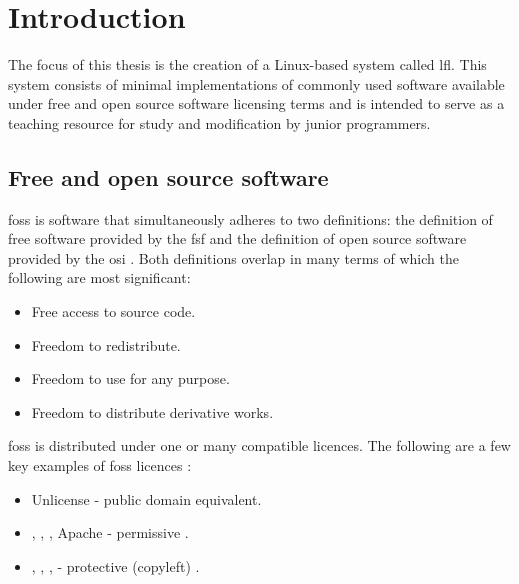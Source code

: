 \section{Introduction}\label{Introduction}

The focus of this thesis is the creation of a Linux-based system called \gls{lfl}\cite{lfl}. This system consists of minimal implementations of commonly used software available under free and open source software licensing terms and is intended to serve as a teaching resource for study and modification by junior programmers.

\subsection{Free and open source software}

\gls{foss} is software that simultaneously adheres to two definitions: the definition of free software \cite{fsf-free-software} provided by the \gls{fsf} \cite{fsf} and the definition of open source software \cite{osi-open-source} provided by the \gls{osi} \cite{osi}. Both definitions overlap in many terms of which the following are most significant:

\begin{itemize}
    \item Free access to source code.
    \item Freedom to redistribute.
    \item Freedom to use for any purpose.
    \item Freedom to distribute derivative works.
\end{itemize}

\gls{foss} is distributed under one or many compatible licences. The following are a few key examples of \gls{foss} licences \cite{spdx-licenses,fsf-licenses}:

\begin{itemize}
    \item Unlicense \cite{unlicense} - public domain \cite{public-domain} equivalent.
    \item {} \cite{mit},  \cite{bsd-2},  \cite{bsd-3}, Apache \cite{apache} - permissive \cite{osi-permissive}.
    \item {} \cite{mpl},  \cite{lgpl},  \cite{gpl},  \cite{agpl} - protective (copyleft) \cite{gnu-copyleft,eupl-copyleft}.
\end{itemize}

